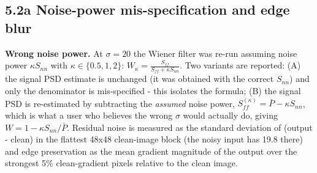 \documentclass[10pt,a4paper]{article}
\begin{document}
\subsection{5.2a Noise-power mis-specification and edge blur}
\textbf{Wrong noise power.} At $\sigma=20$ the Wiener filter was re-run assuming noise power $\kappa S_{nn}$ with $\kappa\in\{0.5,1,2\}$: $W_\kappa=\frac{S_{ff}}{S_{ff}+\kappa S_{nn}}$. Two variants are reported: (A) the signal PSD estimate is unchanged (it was obtained with the correct $S_{nn}$) and only the denominator is mis-specified - this isolates the formula; (B) the signal PSD is re-estimated by subtracting the \textit{assumed} noise power, $S_{ff}^{(\kappa)}=\bar P-\kappa S_{nn}$, which is what a user who believes the wrong $\sigma$ would actually do, giving $W=1-\kappa S_{nn}/\bar P$. Residual noise is measured as the standard deviation of (output - clean) in the flattest 48x48 clean-image block (the noisy input has 19.8 there) and edge preservation as the mean gradient magnitude of the output over the strongest 5\% clean-gradient pixels relative to the clean image.
\end{document}
